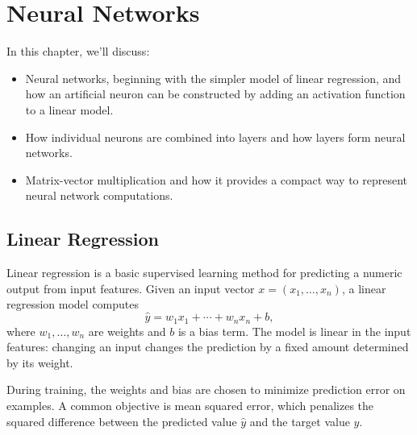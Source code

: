 \documentclass[11pt,openany,oneside]{book}
\begin{document}


\chapter{Neural Networks}
In this chapter, we'll discuss:
\begin{itemize}
      \item Neural networks, beginning with the simpler model of linear regression,
      and how an artificial neuron can be constructed by adding an activation
      function to a linear model.
      \item How individual neurons are combined into layers and how layers form
      neural networks.
      \item Matrix-vector multiplication and how it provides a compact way to
      represent neural network computations.
\end{itemize}

\section{Linear Regression}

Linear regression is a basic supervised learning method for predicting a
numeric output from input features. Given an input vector
$x = (x_1, \ldots, x_n)$, a linear regression model computes
\[
    \hat{y} = w_1x_1 + \cdots + w_nx_n + b,
\]
where $w_1,\ldots,w_n$ are weights and $b$ is a bias term. The model is linear
in the input features: changing an input changes the prediction by a fixed
amount determined by its weight.

During training, the weights and bias are chosen to minimize prediction error
on examples. A common objective is mean squared error, which penalizes the
squared difference between the predicted value $\hat{y}$ and the target value
$y$.
\end{document}
